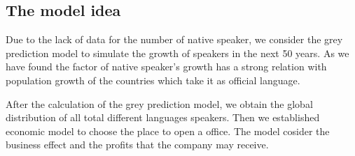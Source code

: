 \documentclass{mcmthesis}
\begin{document}
\subsection{The model idea}
\qquad Due to the lack of data for the number of native speaker, we consider the grey prediction model to simulate the growth of speakers in the next 50 years.
As we have found the factor of native speaker's growth has a strong relation with population growth of the countries which take it as official language.


After the calculation of the grey prediction model, we obtain the global distribution of all total different languages speakers. Then we established economic model to choose the place to open a office.
The model cosider the business effect and the profits that the company may receive.
\end{document}
